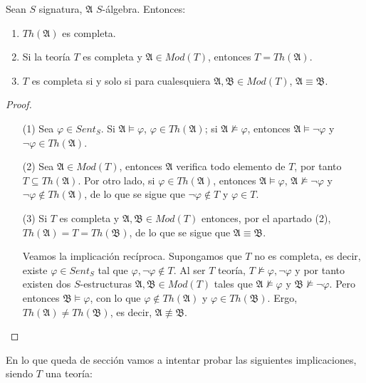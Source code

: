 \begin{prop}\label{complet}
Sean $S$ signatura, $\mathfrak{A}$ $S$-álgebra. Entonces:
\begin{enumerate}
    \item $Th(\mathfrak{A})$ es completa.
    \item Si la teoría $T$ es completa y $\mathfrak{A} \in Mod(T)$, entonces $T = Th(\mathfrak{A})$.
    \item $T$ es completa si y solo si para cualesquiera $\mathfrak{A}, \mathfrak{B} \in Mod(T)$, $\mathfrak{A} \equiv \mathfrak{B}$.
\end{enumerate}
\end{prop}
\begin{proof}\mbox{}
\begin{itemize}
    \item[(1)] Sea $\varphi \in Sent_S$. Si $\mathfrak{A}\vDash \varphi$, $\varphi \in Th(\mathfrak{A})$; si $\mathfrak{A} \nvDash \varphi$, entonces $\mathfrak{A} \vDash \neg \varphi$ y $\neg \varphi\in Th(\mathfrak{A})$.
    \item[(2)] Sea $\mathfrak{A} \in Mod(T)$, entonces $\mathfrak{A}$ verifica todo elemento de $T$, por tanto $T \subseteq Th(\mathfrak{A})$. Por otro lado, si $\varphi \in Th(\mathfrak{A})$, entonces $\mathfrak{A} \vDash \varphi$, $\mathfrak{A} \nvDash \neg \varphi$ y $\neg \varphi \notin Th(\mathfrak{A})$, de lo que se sigue que $\neg\varphi \notin T$ y $\varphi \in T$.
    \item[(3)] Si $T$ es completa y $\mathfrak{A}, \mathfrak{B} \in Mod(T)$ entonces, por el apartado (2), $Th(\mathfrak{A}) = T = Th(\mathfrak{B})$, de lo que se sigue que $\mathfrak{A} \equiv \mathfrak{B}$.
    
    Veamos la implicación recíproca. Supongamos que $T$ no es completa, es decir, existe $\varphi \in Sent_S$ tal que $\varphi, \neg\varphi \notin T$. Al ser $T$ teoría, $T \nvDash \varphi, \neg\varphi$ y por tanto existen dos $S$-estructuras $\mathfrak{A}, \mathfrak{B} \in Mod(T)$ tales que $\mathfrak{A} \nvDash \varphi$ y $\mathfrak{B}\nvDash \neg\varphi$. Pero entonces $\mathfrak{B}\vDash \varphi$, con lo que $\varphi \notin Th(\mathfrak{A})$ y $\varphi \in Th(\mathfrak{B})$. Ergo, $Th(\mathfrak{A})\neq Th(\mathfrak{B})$, es decir, $\mathfrak{A} \not\equiv \mathfrak{B}$.
\end{itemize}
\end{proof}

En lo que queda de sección vamos a intentar probar las siguientes implicaciones, siendo $T$ una teoría:


